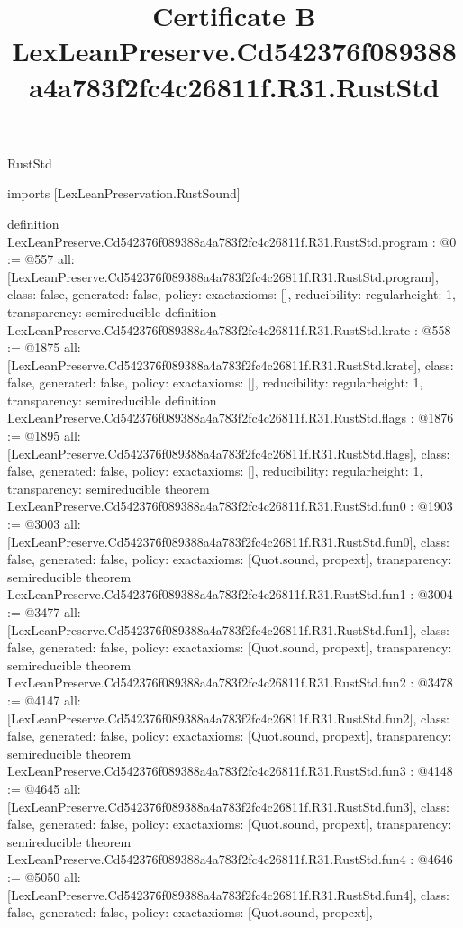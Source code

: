 \begin{lexlean}{RustStd}
\title{Certificate B LexLeanPreserve.Cd542376f089388a4a783f2fc4c26811f.R31.RustStd}
\begin{coremodule}
imports [LexLeanPreservation.RustSound]

definition LexLeanPreserve.Cd542376f089388a4a783f2fc4c26811f.R31.RustStd.program : @0 := @557 {
  all: [LexLeanPreserve.Cd542376f089388a4a783f2fc4c26811f.R31.RustStd.program],
  class: false,
  generated: false,
  policy: exact{axioms: []},
  reducibility: regular{height: 1},
  transparency: semireducible
}
definition LexLeanPreserve.Cd542376f089388a4a783f2fc4c26811f.R31.RustStd.krate : @558 := @1875 {
  all: [LexLeanPreserve.Cd542376f089388a4a783f2fc4c26811f.R31.RustStd.krate],
  class: false,
  generated: false,
  policy: exact{axioms: []},
  reducibility: regular{height: 1},
  transparency: semireducible
}
definition LexLeanPreserve.Cd542376f089388a4a783f2fc4c26811f.R31.RustStd.flags : @1876 := @1895 {
  all: [LexLeanPreserve.Cd542376f089388a4a783f2fc4c26811f.R31.RustStd.flags],
  class: false,
  generated: false,
  policy: exact{axioms: []},
  reducibility: regular{height: 1},
  transparency: semireducible
}
theorem LexLeanPreserve.Cd542376f089388a4a783f2fc4c26811f.R31.RustStd.fun0 : @1903 := @3003 {
  all: [LexLeanPreserve.Cd542376f089388a4a783f2fc4c26811f.R31.RustStd.fun0],
  class: false,
  generated: false,
  policy: exact{axioms: [Quot.sound, propext]},
  transparency: semireducible
}
theorem LexLeanPreserve.Cd542376f089388a4a783f2fc4c26811f.R31.RustStd.fun1 : @3004 := @3477 {
  all: [LexLeanPreserve.Cd542376f089388a4a783f2fc4c26811f.R31.RustStd.fun1],
  class: false,
  generated: false,
  policy: exact{axioms: [Quot.sound, propext]},
  transparency: semireducible
}
theorem LexLeanPreserve.Cd542376f089388a4a783f2fc4c26811f.R31.RustStd.fun2 : @3478 := @4147 {
  all: [LexLeanPreserve.Cd542376f089388a4a783f2fc4c26811f.R31.RustStd.fun2],
  class: false,
  generated: false,
  policy: exact{axioms: [Quot.sound, propext]},
  transparency: semireducible
}
theorem LexLeanPreserve.Cd542376f089388a4a783f2fc4c26811f.R31.RustStd.fun3 : @4148 := @4645 {
  all: [LexLeanPreserve.Cd542376f089388a4a783f2fc4c26811f.R31.RustStd.fun3],
  class: false,
  generated: false,
  policy: exact{axioms: [Quot.sound, propext]},
  transparency: semireducible
}
theorem LexLeanPreserve.Cd542376f089388a4a783f2fc4c26811f.R31.RustStd.fun4 : @4646 := @5050 {
  all: [LexLeanPreserve.Cd542376f089388a4a783f2fc4c26811f.R31.RustStd.fun4],
  class: false,
  generated: false,
  policy: exact{axioms: [Quot.sound, propext]},
}
\end{coremodule}
\end{lexlean}
